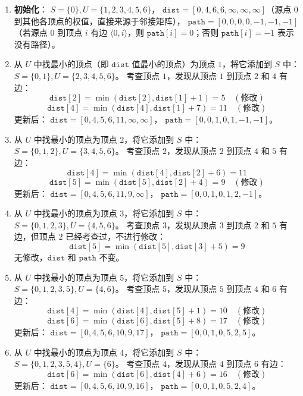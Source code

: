 \documentclass[lang=cn,newtx,10pt,scheme=chinese]{../elegantbook}
\begin{document}
\begin{enumerate}
  \item \textbf{初始化}：  
  $S = \{0\}, U = \{1, 2, 3, 4, 5, 6\}$，  
  $\texttt{dist} = [0, 4, 6, 6, \infty, \infty, \infty]$（源点 $0$ 到其他各顶点的权值，直接来源于邻接矩阵），  
  $\texttt{path} = [0, 0, 0, 0, -1, -1, -1]$（若源点 $0$ 到顶点 $i$ 有边 $\langle 0, i \rangle$，则 $\texttt{path}[i] = 0$；否则 $\texttt{path}[i] = -1$ 表示没有路径）。

  \item 从 $U$ 中找最小的顶点（即 $\texttt{dist}$ 值最小的顶点）为顶点 $1$，将它添加到 $S$ 中：  
  $S = \{0, 1\}, U = \{2, 3, 4, 5, 6\}$。  
  考查顶点 $1$，发现从顶点 $1$ 到顶点 $2$ 和 $4$ 有边：
  \[
  \texttt{dist}[2] = \min(\texttt{dist}[2], \texttt{dist}[1] + 1) = 5 \quad (\text{修改})
  \]
  \[
  \texttt{dist}[4] = \min(\texttt{dist}[4], \texttt{dist}[1] + 7) = 11 \quad (\text{修改})
  \]
  更新后：  
  $\texttt{dist} = [0, 4, 5, 6, 11, \infty, \infty]$，  
  $\texttt{path} = [0, 0, 1, 0, 1, -1, -1]$。

  \item 从 $U$ 中找最小的顶点为顶点 $2$，将它添加到 $S$ 中：  
  $S = \{0, 1, 2\}, U = \{3, 4, 5, 6\}$。  
  考查顶点 $2$，发现从顶点 $2$ 到顶点 $4$ 和 $5$ 有边：
  \[
  \texttt{dist}[4] = \min(\texttt{dist}[4], \texttt{dist}[2] + 6) = 11
  \]
  \[
  \texttt{dist}[5] = \min(\texttt{dist}[5], \texttt{dist}[2] + 4) = 9 \quad (\text{修改})
  \]
  更新后：  
  $\texttt{dist} = [0, 4, 5, 6, 11, 9, \infty]$，  
  $\texttt{path} = [0, 0, 1, 0, 1, 2, -1]$。

  \item 从 $U$ 中找最小的顶点为顶点 $3$，将它添加到 $S$ 中：  
  $S = \{0, 1, 2, 3\}, U = \{4, 5, 6\}$。  
  考查顶点 $3$，发现从顶点 $3$ 到顶点 $2$ 和 $5$ 有边，但顶点 $2$ 已经考查过，不进行修改：
  \[
  \texttt{dist}[5] = \min(\texttt{dist}[5], \texttt{dist}[3] + 5) = 9
  \]
  无修改，$\texttt{dist}$ 和 $\texttt{path}$ 不变。

  \item 从 $U$ 中找最小的顶点为顶点 $5$，将它添加到 $S$ 中：  
  $S = \{0, 1, 2, 3, 5\}, U = \{4, 6\}$。  
  考查顶点 $5$，发现从顶点 $5$ 到顶点 $4$ 和 $6$ 有边：
  \[
  \texttt{dist}[4] = \min(\texttt{dist}[4], \texttt{dist}[5] + 1) = 10 \quad (\text{修改})
  \]
  \[
  \texttt{dist}[6] = \min(\texttt{dist}[6], \texttt{dist}[5] + 8) = 17 \quad (\text{修改})
  \]
  更新后：  
  $\texttt{dist} = [0, 4, 5, 6, 10, 9, 17]$，  
  $\texttt{path} = [0, 0, 1, 0, 5, 2, 5]$。

  \item 从 $U$ 中找最小的顶点为顶点 $4$，将它添加到 $S$ 中：  
  $S = \{0, 1, 2, 3, 5, 4\}, U = \{6\}$。  
  考查顶点 $4$，发现从顶点 $4$ 到顶点 $6$ 有边：
  \[
  \texttt{dist}[6] = \min(\texttt{dist}[6], \texttt{dist}[4] + 6) = 16 \quad (\text{修改})
  \]
  更新后：  
  $\texttt{dist} = [0, 4, 5, 6, 10, 9, 16]$，  
  $\texttt{path} = [0, 0, 1, 0, 5, 2, 4]$。


\end{enumerate}
\end{document}
